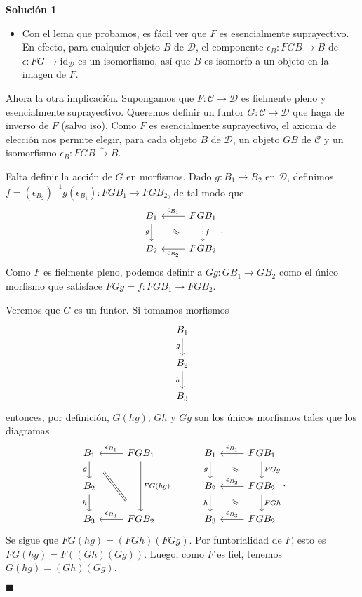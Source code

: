 \documentclass[12pt,letterpaper,titlepage]{article}
\newcommand{\xqed}[1]{%
  \leavevmode\unskip\penalty9999 \hbox{}\nobreak\hfill
  \quad\hbox{\ensuremath{#1}}}
\theoremstyle{definition}
\newtheorem*{soltemp}{Solución}
\newenvironment{sol}[1]{%
    \begin{soltemp}#1}{%
    \xqed{\blacksquare}\end{soltemp}%
}
\renewcommand\cal[1]{\mathcal{#1}}
\newcommand\com[2]{\ar[equal,from={#1},to={#2},shorten=5mm]}
\newcommand\<{\langle}
\renewcommand\>{\rangle}
\newcommand{\id}{\mathrm{id}}
\begin{document}
\begin{sol}
\begin{itemize}
        \item
        Con el lema que probamos, es fácil ver que $F$ es
        esencialmente suprayectivo.
        En efecto, 
        para cualquier objeto $B$ de $\cal D$, el componente
        $\epsilon_B:FGB\to B$ de $\epsilon:FG\to\id_{\cal D}$ es un
        isomorfismo, así que $B$ es isomorfo a un objeto en la
        imagen de $F$.
    \end{itemize}
    Ahora la otra implicación.
    Supongamos que $F:\cal C\to\cal D$ es fielmente pleno
    y esencialmente suprayectivo.
    Queremos definir un funtor $G:\cal C\to \cal D$ que haga de
    inverso de $F$ (salvo iso).
    Como $F$ es esencialmente suprayectivo, el axioma de
    elección nos permite elegir, para cada objeto $B$ de $\cal D$,
    un objeto $GB$ de $\cal C$ y un isomorfismo
    $\epsilon_B:FGB\xrightarrow{\sim} B$.
    
    Falta definir la acción de $G$ en morfismos.
    Dado $g:B_1\to B_2$ en $\cal D$, definimos
    $f=(\epsilon_{B_2})^{-1}g(\epsilon_{B_1}):FGB_1\to FGB_2$, de tal
    modo que
    \[
        \begin{tikzcd}
            B_1 \ar[d,"g"']
            & FGB_1 \ar[l,"\epsilon_{B_1}"'] \ar[d,"f",dotted] \\
            B_2 & FGB_2 \ar[l,"\epsilon_{B_2}"]
            \com{1-1}{2-2}
        \end{tikzcd}
    .\]
    Como $F$ es fielmente pleno, podemos definir a $Gg:GB_1\to GB_2$
    como el único morfismo que satisface $FGg=f:FGB_1\to FGB_2$.
    
    Veremos que $G$ es un funtor.
    Si tomamos morfismos
    \[
        \begin{tikzcd}
            B_1 \ar[d,"g"'] \\
            B_2 \ar[d,"h"'] \\
            B_3
        \end{tikzcd}
    \]
    entonces, por definición, $G(hg)$, $Gh$ y $Gg$
    son los únicos morfismos tales que los diagramas
    \[
        \begin{tikzcd}
            B_1 \ar[d,"g"'] & FGB_1 \ar[l,"\epsilon_{B_1}"'] \ar[dd,"FG(hg)"] \\
            B_2 \ar[d,"h"'] \\
            B_3 & FGB_2 \ar[l,"\epsilon_{B_3}"']
            \com{1-1}{3-2}
        \end{tikzcd}
        \hspace{10mm}
        \begin{tikzcd}
            B_1 \ar[d,"g"'] & FGB_1 \ar[l,"\epsilon_{B_1}"'] \ar[d,"FGg"] \\
            B_2 \ar[d,"h"'] & FGB_2 \ar[l,"\epsilon_{B_2}"'] \ar[d,"FGh"] \\
            B_3 & FGB_2 \ar[l,"\epsilon_{B_3}"']
            \com{1-1}{2-2} \com{2-1}{3-2}
        \end{tikzcd}
    .\]
    Se sigue que $FG(hg)=(FGh)(FGg)$.
    Por funtorialidad de $F$, esto es $FG(hg)=F((Gh)(Gg))$.
    Luego, como $F$ es fiel, tenemos $G(hg)=(Gh)(Gg)$.
    

\end{sol}
\end{document}
